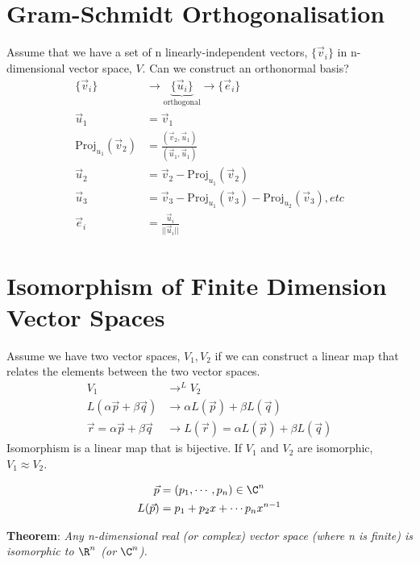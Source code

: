 \documentclass[cplx.tex]{subfiles}
\begin{document}
\section{Gram-Schmidt Orthogonalisation}
Assume that we have a set of n linearly-independent vectors, $\{\vec{v}_i\}$ in n-dimensional vector space, $V$.
Can we construct an orthonormal basis?
\begin{align}
    \{\vec{v}_i\} &\to \underbrace{\{\vec{u}_i\}}_{\text{orthogonal}} \to \{\vec{e}_i\} \\
    \vec{u}_1 &= \vec{v}_1 \\
    \text{Proj}_{u_1}(\vec{v}_2) &= \frac{(\vec{v}_2,\vec{u}_1)}{(\vec{u}_1,\vec{u}_1)} \\
    \vec{u}_2 &= \vec{v}_2 - \text{Proj}_{u_1}(\vec{v}_2) \\
    \vec{u}_3 &= \vec{v}_3 - \text{Proj}_{u_1}(\vec{v}_3) - \text{Proj}_{u_2}(\vec{v}_3),etc \\
    \vec{e}_i &= \frac{\vec{u}_i}{||\vec{u}_i||}
\end{align}

\section{Isomorphism of Finite Dimension Vector Spaces}
Assume we have two vector spaces, $V_1,V_2$ if we can construct a linear map that relates the elements between the two vector spaces.
\begin{align}
    V_1 &\to^L V_2 \\
    L(\alpha\vec{p} + \beta\vec{q}) &\to \alpha L(\vec{p}) + \beta L(\vec{q}) \\
    \vec{r} = \alpha\vec{p} + \beta \vec{q} &\to L(\vec{r}) = \alpha L(\vec{p}) + \beta L(\vec{q})
\end{align}
Isomorphism is a linear map that is bijective.
If $V_1$ and $V_2$ are isomorphic, $V_1 \approx V_2$.

\begin{example}
    \begin{align}
        \vec{p} &= (p_1,\cdots,p_n) \in \C^n \\
        L(\vec{p}) &= p_1 + p_2x + \cdots p_nx^{n-1}
    \end{align}
\end{example}

\textbf{Theorem}: \emph{Any n-dimensional real (or complex) vector space (where n is finite) is isomorphic to $\R^n$ (or $\C^n$).}
\end{document}
